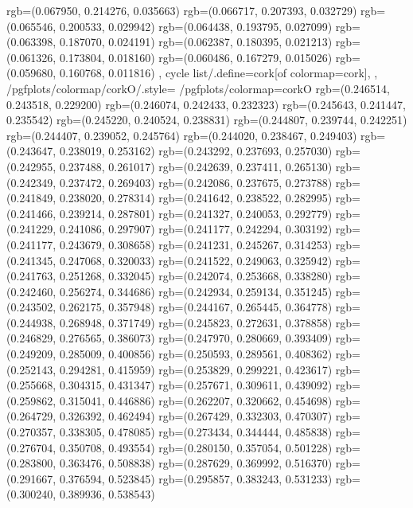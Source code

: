 {{{					rgb=(0.067950, 0.214276, 0.035663)
					rgb=(0.066717, 0.207393, 0.032729)
					rgb=(0.065546, 0.200533, 0.029942)
					rgb=(0.064438, 0.193795, 0.027099)
					rgb=(0.063398, 0.187070, 0.024191)
					rgb=(0.062387, 0.180395, 0.021213)
					rgb=(0.061326, 0.173804, 0.018160)
					rgb=(0.060486, 0.167279, 0.015026)
					rgb=(0.059680, 0.160768, 0.011816)
			},
		cycle list/.define={cork}{[of colormap=cork]},
		},
		/pgfplots/colormap/corkO/.style={
			/pgfplots/colormap={corkO}{%
					rgb=(0.246514, 0.243518, 0.229200)
					rgb=(0.246074, 0.242433, 0.232323)
					rgb=(0.245643, 0.241447, 0.235542)
					rgb=(0.245220, 0.240524, 0.238831)
					rgb=(0.244807, 0.239744, 0.242251)
					rgb=(0.244407, 0.239052, 0.245764)
					rgb=(0.244020, 0.238467, 0.249403)
					rgb=(0.243647, 0.238019, 0.253162)
					rgb=(0.243292, 0.237693, 0.257030)
					rgb=(0.242955, 0.237488, 0.261017)
					rgb=(0.242639, 0.237411, 0.265130)
					rgb=(0.242349, 0.237472, 0.269403)
					rgb=(0.242086, 0.237675, 0.273788)
					rgb=(0.241849, 0.238020, 0.278314)
					rgb=(0.241642, 0.238522, 0.282995)
					rgb=(0.241466, 0.239214, 0.287801)
					rgb=(0.241327, 0.240053, 0.292779)
					rgb=(0.241229, 0.241086, 0.297907)
					rgb=(0.241177, 0.242294, 0.303192)
					rgb=(0.241177, 0.243679, 0.308658)
					rgb=(0.241231, 0.245267, 0.314253)
					rgb=(0.241345, 0.247068, 0.320033)
					rgb=(0.241522, 0.249063, 0.325942)
					rgb=(0.241763, 0.251268, 0.332045)
					rgb=(0.242074, 0.253668, 0.338280)
					rgb=(0.242460, 0.256274, 0.344686)
					rgb=(0.242934, 0.259134, 0.351245)
					rgb=(0.243502, 0.262175, 0.357948)
					rgb=(0.244167, 0.265445, 0.364778)
					rgb=(0.244938, 0.268948, 0.371749)
					rgb=(0.245823, 0.272631, 0.378858)
					rgb=(0.246829, 0.276565, 0.386073)
					rgb=(0.247970, 0.280669, 0.393409)
					rgb=(0.249209, 0.285009, 0.400856)
					rgb=(0.250593, 0.289561, 0.408362)
					rgb=(0.252143, 0.294281, 0.415959)
					rgb=(0.253829, 0.299221, 0.423617)
					rgb=(0.255668, 0.304315, 0.431347)
					rgb=(0.257671, 0.309611, 0.439092)
					rgb=(0.259862, 0.315041, 0.446886)
					rgb=(0.262207, 0.320662, 0.454698)
					rgb=(0.264729, 0.326392, 0.462494)
					rgb=(0.267429, 0.332303, 0.470307)
					rgb=(0.270357, 0.338305, 0.478085)
					rgb=(0.273434, 0.344444, 0.485838)
					rgb=(0.276704, 0.350708, 0.493554)
					rgb=(0.280150, 0.357054, 0.501228)
					rgb=(0.283800, 0.363476, 0.508838)
					rgb=(0.287629, 0.369992, 0.516370)
					rgb=(0.291667, 0.376594, 0.523845)
					rgb=(0.295857, 0.383243, 0.531233)
					rgb=(0.300240, 0.389936, 0.538543)
}}}

